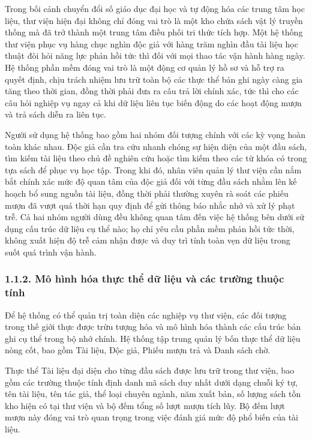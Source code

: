 \documentclass[14pt,a4paper]{extarticle}
\begin{document}
Trong bối cảnh chuyển đổi số giáo dục đại học và tự động hóa các trung tâm học liệu, thư viện hiện đại không chỉ đóng vai trò là một kho chứa sách vật lý truyền thống mà đã trở thành một trung tâm điều phối tri thức tích hợp. Một hệ thống thư viện phục vụ hàng chục nghìn độc giả với hàng trăm nghìn đầu tài liệu học thuật đòi hỏi năng lực phản hồi tức thì đối với mọi thao tác vận hành hàng ngày. Hệ thống phần mềm đóng vai trò là một động cơ quản lý hồ sơ và hỗ trợ ra quyết định, chịu trách nhiệm lưu trữ toàn bộ các thực thể bản ghi ngày càng gia tăng theo thời gian, đồng thời phải đưa ra câu trả lời chính xác, tức thì cho các câu hỏi nghiệp vụ ngay cả khi dữ liệu liên tục biến động do các hoạt động mượn và trả sách diễn ra liên tục.

Người sử dụng hệ thống bao gồm hai nhóm đối tượng chính với các kỳ vọng hoàn toàn khác nhau. Độc giả cần tra cứu nhanh chóng sự hiện diện của một đầu sách, tìm kiếm tài liệu theo chủ đề nghiên cứu hoặc tìm kiếm theo các từ khóa có trong tựa sách để phục vụ học tập. Trong khi đó, nhân viên quản lý thư viện cần nắm bắt chính xác mức độ quan tâm của độc giả đối với từng đầu sách nhằm lên kế hoạch bổ sung nguồn tài liệu, đồng thời phải thường xuyên rà soát các phiếu mượn đã vượt quá thời hạn quy định để gửi thông báo nhắc nhở và xử lý phạt trễ. Cả hai nhóm người dùng đều không quan tâm đến việc hệ thống bên dưới sử dụng cấu trúc dữ liệu cụ thể nào; họ chỉ yêu cầu phần mềm phản hồi tức thời, không xuất hiện độ trễ cảm nhận được và duy trì tính toàn vẹn dữ liệu trong suốt quá trình vận hành.

\subsubsection*{1.1.2. Mô hình hóa thực thể dữ liệu và các trường thuộc tính}

Để hệ thống có thể quản trị toàn diện các nghiệp vụ thư viện, các đối tượng trong thế giới thực được trừu tượng hóa và mô hình hóa thành các cấu trúc bản ghi cụ thể trong bộ nhớ chính. Hệ thống tập trung quản lý bốn thực thể dữ liệu nòng cốt, bao gồm Tài liệu, Độc giả, Phiếu mượn trả và Danh sách chờ.

Thực thể Tài liệu đại diện cho từng đầu sách được lưu trữ trong thư viện, bao gồm các trường thuộc tính định danh mã sách duy nhất dưới dạng chuỗi ký tự, tên tài liệu, tên tác giả, thể loại chuyên ngành, năm xuất bản, số lượng sách tồn kho hiện có tại thư viện và bộ đếm tổng số lượt mượn tích lũy. Bộ đếm lượt mượn này đóng vai trò quan trọng trong việc đánh giá mức độ phổ biến của tài liệu.
\end{document}
